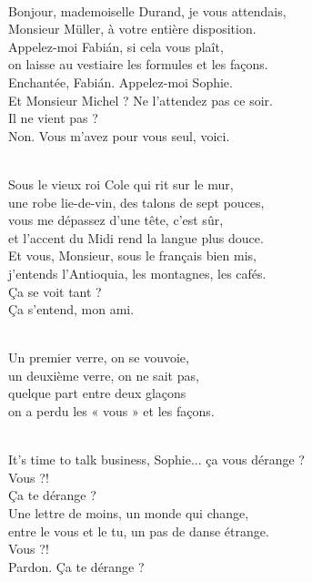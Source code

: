 \begin{lyrics}

\\
Bonjour, mademoiselle Durand, je vous attendais,\\
Monsieur Müller, à votre entière disposition.\\
Appelez-moi Fabián, si cela vous plaît,\\
on laisse au vestiaire les formules et les façons.
\\
Enchantée, Fabián. Appelez-moi Sophie.\\
Et Monsieur Michel ? Ne l'attendez pas ce soir.
\\
Il ne vient pas ?
\\
Non. Vous m'avez pour vous seul, voici.

\\
Sous le vieux roi Cole qui rit sur le mur,\\
une robe lie-de-vin, des talons de sept pouces,\\
vous me dépassez d'une tête, c'est sûr,\\
et l'accent du Midi rend la langue plus douce.
\\
Et vous, Monsieur, sous le français bien mis,\\
j'entends l'Antioquia, les montagnes, les cafés.
\\
Ça se voit tant ?
\\
Ça s'entend, mon ami.

\\
Un premier verre, on se vouvoie,\\
un deuxième verre, on ne sait pas,\\
quelque part entre deux glaçons\\
on a perdu les « vous » et les façons.

\\
It's time to talk business, Sophie... ça vous dérange ?
\\
Vous ?!
\\
Ça te dérange ?
\\
Une lettre de moins, un monde qui change,\\
entre le vous et le tu, un pas de danse étrange.
\\
Vous ?!
\\
Pardon. Ça te dérange ?


\end{lyrics}
